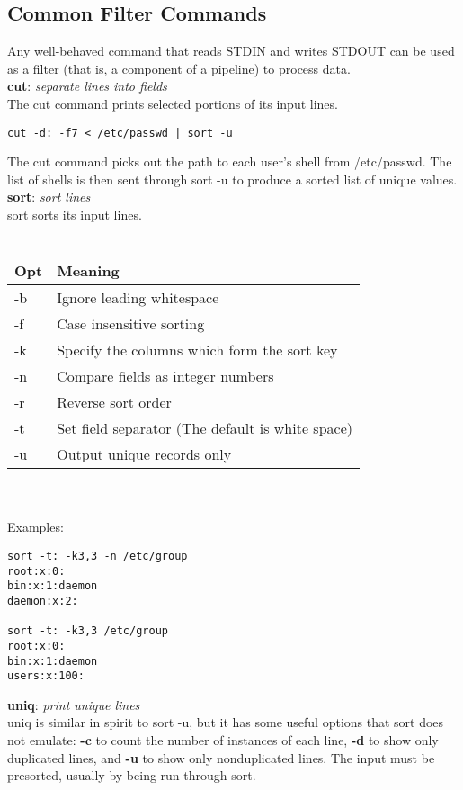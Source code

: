\documentclass[10pt,letterpaper]{book}
\begin{document}
\subsection{Common Filter Commands}
Any well-behaved command that reads STDIN and writes STDOUT can be used
as a filter (that is, a component of a pipeline) to process data.\\
\textbf{cut}: \textit{separate lines into fields}\\
The cut command prints selected portions of its input lines.\\
\begin{lstlisting}
cut -d: -f7 < /etc/passwd | sort -u
\end{lstlisting} 
The cut command picks out the path to each user's shell from /etc/passwd. The list of shells is then sent through sort -u to produce a sorted list of unique values.
\\
\textbf{sort}: \textit{sort lines}\\
sort sorts its input lines.\\
\\
\begin{tabular}{l l}
\hline
\textbf{Opt} & \textbf{Meaning}\\
\hline 
-b & Ignore leading whitespace\\
-f & Case insensitive sorting\\
-k & Specify the columns which form the sort key\\
-n & Compare fields as integer numbers\\
-r & Reverse sort order\\
-t & Set field separator (The default is white space)\\
-u & Output unique records only\\
\hline
\end{tabular}
\\
\\
Examples:
\begin{lstlisting}
sort -t: -k3,3 -n /etc/group
root:x:0:
bin:x:1:daemon
daemon:x:2:

sort -t: -k3,3 /etc/group
root:x:0:
bin:x:1:daemon
users:x:100:
\end{lstlisting}
\textbf{uniq}: \textit{print unique lines}\\
uniq is similar in spirit to sort -u, but it has some useful options that sort does not emulate: \textbf{-c} to count the number of instances of each line, \textbf{-d} to show only duplicated lines, and \textbf{-u} to show only nonduplicated lines. The input must be presorted, usually by being run through sort.\\
\end{document}
